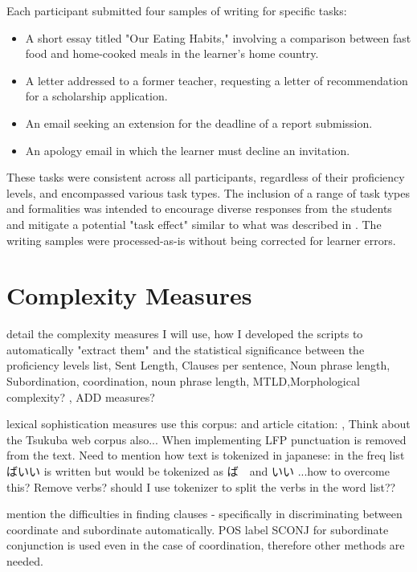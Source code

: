 Each participant submitted four samples of writing for specific tasks:
\begin{itemize}
    \item A short essay titled "Our Eating Habits," involving a comparison between fast food and home-cooked meals in the learner's home country.
    \item A letter addressed to a former teacher, requesting a letter of recommendation for a scholarship application.
    \item An email seeking an extension for the deadline of a report submission.
    \item An apology email in which the learner must decline an invitation.
\end{itemize}
These tasks were consistent across all participants, regardless of their proficiency levels, and encompassed various task types. The inclusion of a range of task types and formalities was intended to encourage diverse responses from the students and mitigate a potential "task effect" similar to what  was described in \cite{Alexpoulou2017}. The writing samples were processed-as-is without being corrected for learner errors.

\section{Complexity Measures}
detail the complexity measures I will use, how I developed the scripts to automatically "extract them" and the statistical significance between the proficiency levels
list, Sent Length, Clauses per sentence, Noun phrase length,  Subordination, coordination, noun phrase length, MTLD,Morphological complexity? , ADD measures?

lexical sophistication measures use this corpus: \cite{BCCWJ_List} and article citation: \cite{maekawa2014}, Think
about the Tsukuba web corpus also...
When implementing LFP punctuation is removed from the text. Need to mention how text is tokenized in japanese: in
the freq list ばいい is written but would be tokenized as ば　and いい ...how to overcome this? Remove verbs? should I use
tokenizer to split the verbs in the word list??

mention the difficulties in finding clauses - specifically in discriminating between coordinate and subordinate
automatically.  POS label SCONJ for subordinate conjunction is used even in the case of coordination, therefore
other methods are needed.

